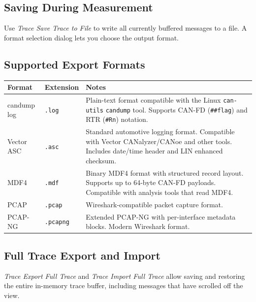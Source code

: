\documentclass[a4paper,11pt]{article}
\newcommand{\menu}[1]{\textit{#1}}
\newcommand{\file}[1]{\texttt{#1}}
\begin{document}
\subsection{Saving During Measurement}

Use \menu{Trace \textrightarrow{} Save Trace to File} to write all currently buffered
messages to a file. A format selection dialog lets you choose the output format.

\subsection{Supported Export Formats}

\begin{longtable}{p{3cm} p{2.5cm} p{7.5cm}}
  \toprule
  \textbf{Format} & \textbf{Extension} & \textbf{Notes} \\
  \midrule
  \endhead
  candump log     & \file{.log}     & Plain-text format compatible with the Linux
                                      \texttt{can-utils} \texttt{candump} tool.
                                      Supports CAN-FD (\texttt{\#\#flag}) and
                                      RTR (\texttt{\#Rn}) notation. \\[0.4em]
  Vector ASC      & \file{.asc}     & Standard automotive logging format.
                                      Compatible with Vector CANalyzer/CANoe and
                                      other tools. Includes date/time header and
                                      LIN enhanced checksum. \\[0.4em]
  MDF4            & \file{.mdf}     & Binary MDF4 format with structured record
                                      layout. Supports up to 64-byte CAN-FD payloads.
                                      Compatible with analysis tools that read MDF4. \\[0.4em]
  PCAP            & \file{.pcap}    & Wireshark-compatible packet capture format. \\[0.4em]
  PCAP-NG         & \file{.pcapng}  & Extended PCAP-NG with per-interface metadata
                                      blocks. Modern Wireshark format. \\
  \bottomrule
\end{longtable}

\subsection{Full Trace Export and Import}

\menu{Trace \textrightarrow{} Export Full Trace} and \menu{Trace \textrightarrow{} Import Full Trace}
allow saving and restoring the entire in-memory trace buffer, including messages
that have scrolled off the view.
\end{document}
